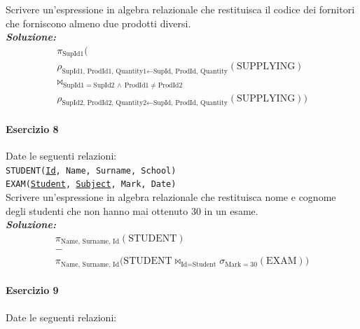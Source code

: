 \documentclass[12pt]{extarticle}
\begin{document}
\noindent Scrivere un'espressione in algebra relazionale che restituisca il codice dei fornitori che forniscono almeno due prodotti diversi.\\

\noindent \textbf{\textit{Soluzione:}}
\[
\begin{gathered}
\pi_{\text{SupId1}} \Big( \\
\rho_{\text{SupId1, ProdId1, Quantity1} \leftarrow \text{SupId, ProdId, Quantity}}(\text{SUPPLYING}) \\
\bowtie_{\text{SupId1} = \text{SupId2} \,\land\, \text{ProdId1} \neq \text{ProdId2}} \\
\rho_{\text{SupId2, ProdId2, Quantity2} \leftarrow \text{SupId, ProdId, Quantity}}(\text{SUPPLYING}) \Big)
\end{gathered}
\]

\vspace{1em}

\paragraph{Esercizio 8} Date le seguenti relazioni:\\

\noindent \texttt{STUDENT(\underline{Id}, Name, Surname, School)}\\
\texttt{EXAM(\underline{Student}, \underline{Subject}, Mark, Date)}\\[0.5em]

\noindent Scrivere un'espressione in algebra relazionale che restituisca nome e cognome degli studenti che non hanno mai ottenuto 30 in un esame.\\

\noindent \textbf{\textit{Soluzione:}}
\[
\begin{gathered}
\pi_{\text{Name, Surname, Id}}(\text{STUDENT}) \\
- \\
\pi_{\text{Name, Surname, Id}} \big( \text{STUDENT} \bowtie_{\text{Id} = \text{Student}} \sigma_{\text{Mark} = 30}(\text{EXAM}) \big)
\end{gathered}
\]

\vspace{1em}

\paragraph{Esercizio 9} Date le seguenti relazioni:\\
\end{document}
